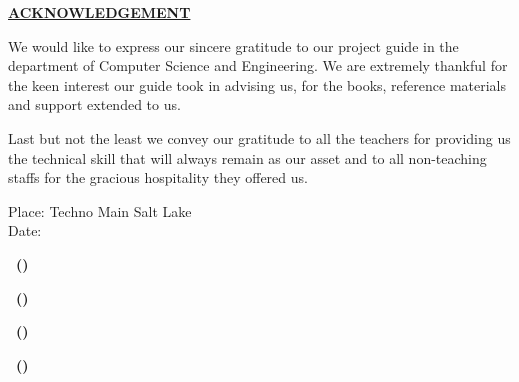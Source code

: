 \thispagestyle{plain}

\begin{center}
 \Large {\bf \uppercase {\underline {Acknowledgement}}}
\end{center}

\vspace{3\baselineskip}

\noindent
We would like to express our sincere gratitude to our project guide in the department of Computer Science and Engineering. We are extremely thankful for the keen interest our guide took in advising us, for the books, reference materials and support extended to us.


\vspace{\baselineskip}
\noindent
Last but not the least we convey our gratitude to all the teachers for providing us the technical skill that will always remain as our asset and to all non-teaching staffs for the gracious hospitality they offered us.

\vspace{\baselineskip}
\noindent
Place: Techno Main Salt Lake \\
Date: 


\hspace{1.0\baselineskip}

\begin{flushright}

\vspace{2\baselineskip}
\textbf{\mynameone ~(\myrollnoone)}

\vspace{2\baselineskip}
\textbf{\mynametwo ~(\myrollnotwo)}

\vspace{2\baselineskip}
\textbf{\mynamethree ~(\myrollnothree)}

\vspace{2\baselineskip}
\textbf{\mynamefour ~(\myrollnofour)}

\end{flushright}



